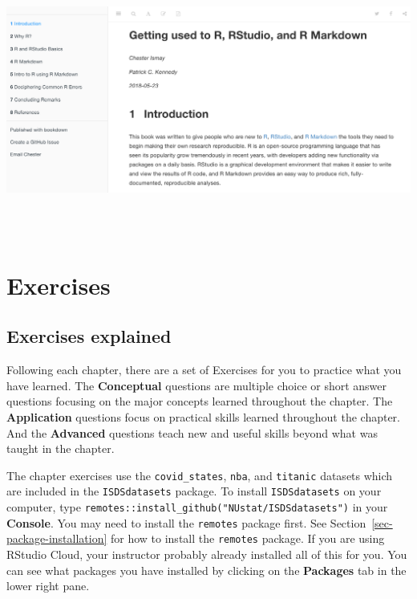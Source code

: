 \documentclass[
  letterpaper,
  DIV=11,
  numbers=noendperiod]{scrreprt}
\theoremstyle{definition}
\theoremstyle{remark}
\begin{document}
\includegraphics[width=\textwidth,height=3.5in]{images/gettting-used-to-R.png}

\hypertarget{sec-ex01}{%
\section{Exercises}\label{sec-ex01}}

\hypertarget{sec-ex00-explained}{%
\subsection{Exercises explained}\label{sec-ex00-explained}}

Following each chapter, there are a set of Exercises for you to practice
what you have learned. The \textbf{Conceptual} questions are multiple
choice or short answer questions focusing on the major concepts learned
throughout the chapter. The \textbf{Application} questions focus on
practical skills learned throughout the chapter. And the
\textbf{Advanced} questions teach new and useful skills beyond what was
taught in the chapter.

The chapter exercises use the \texttt{covid\_states}, \texttt{nba}, and
\texttt{titanic} datasets which are included in the
\texttt{ISDSdatasets} package. To install \texttt{ISDSdatasets} on your
computer, type \texttt{remotes::install\_github("NUstat/ISDSdatasets")}
in your \textbf{Console}. You may need to install the \texttt{remotes}
package first. See Section~\ref{sec-package-installation} for how to
install the \texttt{remotes} package. If you are using RStudio Cloud,
your instructor probably already installed all of this for you. You can
see what packages you have installed by clicking on the
\textbf{Packages} tab in the lower right pane.
\end{document}
